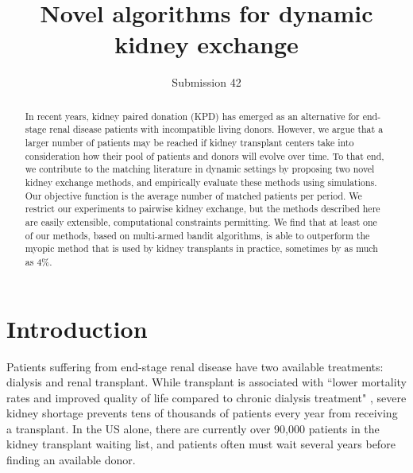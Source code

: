 \documentclass[format=acmsmall, review=false]{acmart}
\begin{document}
\title[Novel algorithms for dynamic kidney exchange]{Novel algorithms for dynamic kidney exchange}  
\author{Submission 42}

\begin{abstract}
In recent years, kidney paired donation (KPD) has emerged as an alternative for end-stage renal disease patients with incompatible living donors. However, we argue that a larger number of patients may be reached if kidney transplant centers take into consideration how their pool of patients and donors will evolve over time. To that end, we contribute to the matching literature in dynamic settings by proposing two novel kidney exchange methods, and empirically evaluate these methods using simulations. Our objective function is the average number of matched patients per period. We restrict our experiments to pairwise kidney exchange, but the methods described here are easily extensible, computational constraints permitting. We find that at least one of our methods, based on multi-armed bandit algorithms, is able to outperform the myopic method that is used by kidney transplants in practice, sometimes by as much as 4\%.
\end{abstract}


\maketitle

\section{Introduction}

Patients suffering from end-stage renal disease have two available treatments: dialysis and renal transplant. While transplant is associated with ``lower mortality rates and improved quality of life compared to chronic dialysis treatment" \citep{tonelli2011systematic}, severe kidney shortage prevents tens of thousands of patients every year from receiving a transplant. In the US alone, there are currently over 90,000 patients in the kidney transplant waiting list, and patients often must wait several years before finding an available donor.
\end{document}

